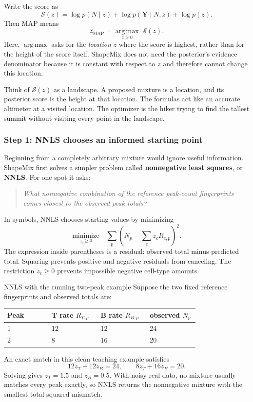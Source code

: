\documentclass[11pt]{article}
\begin{document}
Write the score as
\[
\mathcal S(z)
=
\log p(N\mid z)
+\log p(\boldsymbol Y\mid N,z)
+\log p(z).
\]
Then MAP means
\[
\widehat z_{\mathrm{MAP}}
=\underset{z>0}{\operatorname{arg\,max}}\;\mathcal S(z).
\]
Here, \(\operatorname{arg\,max}\) asks for the \emph{location} \(z\) where the
score is highest, rather than for the height of the score itself. ShapeMix does
not need the posterior's evidence denominator because it is constant with
respect to \(z\) and therefore cannot change this location.

\begin{bigidea}
Think of \(\mathcal S(z)\) as a landscape. A proposed mixture is a location, and
its posterior score is the height at that location. The formulas act like an
accurate altimeter at a visited location. The optimizer is the hiker trying to
find the tallest summit without visiting every point in the landscape.
\end{bigidea}

\subsubsection*{Step 1: NNLS chooses an informed starting point}

Beginning from a completely arbitrary mixture would ignore useful information.
ShapeMix first solves a simpler problem called \textbf{nonnegative least squares},
or \textbf{NNLS}. For one spot it asks:

\begin{quote}
\emph{What nonnegative combination of the reference peak-count fingerprints
comes closest to the observed peak totals?}
\end{quote}

In symbols, NNLS chooses starting values by minimizing
\[
\boxed{
\underset{z_c\ge 0}{\text{minimize}}
\quad
\sum_p
\left(
N_p-\sum_c z_cR_{c,p}
\right)^2.
}
\]
The expression inside parentheses is a residual: observed total minus predicted
total. Squaring prevents positive and negative residuals from canceling. The
restriction \(z_c\ge0\) prevents impossible negative cell-type amounts.

\begin{worked}{NNLS with the running two-peak example}
Suppose the two fixed reference fingerprints and observed totals are:

\begin{center}
\begin{tabular}{C{0.18\linewidth}C{0.20\linewidth}C{0.20\linewidth}C{0.20\linewidth}}
\toprule
Peak & T rate \(R_{T,p}\) & B rate \(R_{B,p}\) & observed \(N_p\) \\
 & 12 & 12 & 24 \\
2 & 8 & 16 & 20 \\
\bottomrule
\end{tabular}
\end{center}

An exact match in this clean teaching example satisfies
\[
12z_T+12z_B=24,
\qquad
8z_T+16z_B=20.
\]
Solving gives \(z_T=1.5\) and \(z_B=0.5\). With noisy real data, no mixture
usually matches every peak exactly, so NNLS returns the nonnegative mixture with
the smallest total squared mismatch.
\end{worked}
\end{document}

